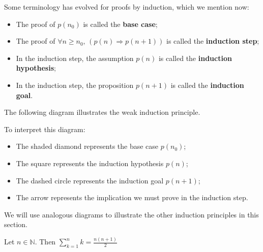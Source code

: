 Some terminology has evolved for proofs by induction, which we mention now:
\begin{itemize}
\item The proof of $p(n_0)$ is called the \textbf{base case};
\item The proof of $\forall n \ge n_0,\, (p(n) \Rightarrow p(n+1))$ is called the \textbf{induction step};
\item In the induction step, the assumption $p(n)$ is called the \textbf{induction hypothesis};
\item In the induction step, the proposition $p(n+1)$ is called the \textbf{induction goal}.
\end{itemize}

The following diagram illustrates the weak induction principle.

\begin{center}
\end{center}

To interpret this diagram:
\begin{itemize}
\item The shaded diamond represents the base case $p(n_0)$;
\item The square represents the induction hypothesis $p(n)$;
\item The dashed circle represents the induction goal $p(n+1)$;
\item The arrow represents the implication we must prove in the induction step.
\end{itemize}

We will use analogous diagrams to illustrate the other induction principles in this section.

\begin{proposition}
\label{propSumConsecInduction}
Let $n \in \mathbb{N}$. Then $\displaystyle\sum_{k=1}^n k = \frac{n(n+1)}{2}$
\end{proposition}

